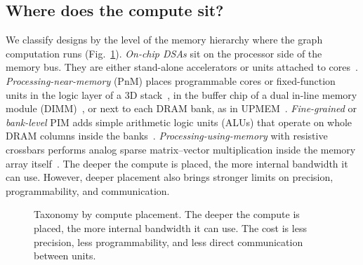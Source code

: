 \documentclass[journal,onecolumn]{IEEEtran}
\begin{document}
\subsection{Where does the compute sit?}
We classify designs by the level of the memory hierarchy where the graph computation runs (Fig.~\ref{fig:placement}). \emph{On-chip DSAs} sit on the processor side of the memory bus. They are either stand-alone accelerators or units attached to cores~\cite{ham2016graphicionado,mukkara2018hats,zhao2022tdgraph}. \emph{Processing-near-memory} (PnM) places programmable cores or fixed-function units in the logic layer of a 3D stack~\cite{ahn2015tesseract,zhuo2019graphq}, in the buffer chip of a dual in-line memory module (DIMM)~\cite{talati2022ndminer}, or next to each DRAM bank, as in UPMEM~\cite{gomezluna2022prim}. \emph{Fine-grained} or \emph{bank-level} PIM adds simple arithmetic logic units (ALUs) that operate on whole DRAM columns inside the banks~\cite{yenimol2026cograf,shin2025fala}. \emph{Processing-using-memory} with resistive crossbars performs analog sparse matrix--vector multiplication inside the memory array itself~\cite{song2018graphr,zheng2020spara,challapalle2020gaasx}. The deeper the compute is placed, the more internal bandwidth it can use. However, deeper placement also brings stronger limits on precision, programmability, and communication.

\begin{figure}[t]
\centering
{}
\caption{Taxonomy by compute placement. The deeper the compute is placed, the more internal bandwidth it can use. The cost is less precision, less programmability, and less direct communication between units.}
\label{fig:placement}
\end{figure}
\end{document}
